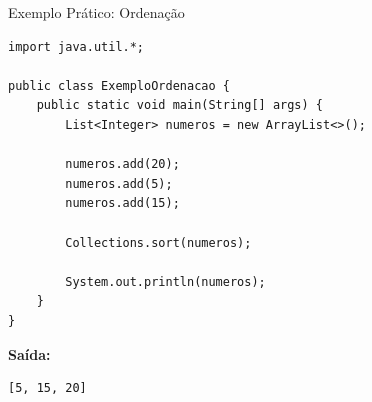 \documentclass[9pt]{beamer}
\begin{document}
\begin{frame}[fragile]{Exemplo Prático: Ordenação}
    \begin{lstlisting}
import java.util.*;

public class ExemploOrdenacao {
    public static void main(String[] args) {
        List<Integer> numeros = new ArrayList<>();

        numeros.add(20);
        numeros.add(5);
        numeros.add(15);

        Collections.sort(numeros);

        System.out.println(numeros);
    }
}
    \end{lstlisting}
    \textbf{Saída:}
    \begin{lstlisting}[numbers=none, backgroundcolor=\color{white}]
[5, 15, 20]
    \end{lstlisting}
\end{frame}
\end{document}
